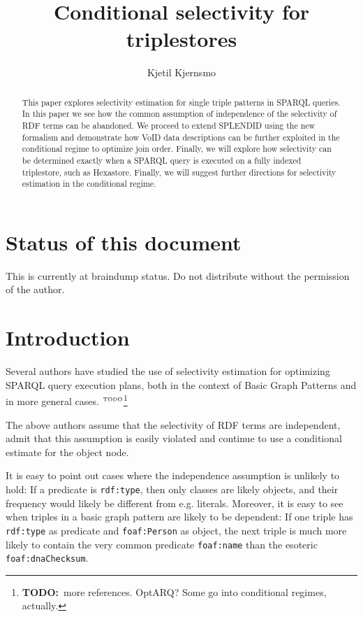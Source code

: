 \documentclass[12pt, draft]{article}
\title{Conditional selectivity for triplestores}
\author{Kjetil Kjernsmo}
\newcommand{\rdfterm}[1]{\texttt{#1}}
\newcommand{\todo}[1]{\ensuremath{^{\textrm{\tiny{TODO}\normalsize}}}\footnote{\textbf{TODO:}~#1}}
\begin{document}
\maketitle

\section*{Status of this document}

This is currently at braindump status. Do not distribute without the
permission of the author.

\begin{abstract}
  This paper explores selectivity estimation for single triple
  patterns in SPARQL queries. In this paper we see how the common
  assumption of independence of the selectivity of RDF terms can be
  abandoned. We proceed to extend SPLENDID\cite{splendid} using the
  new formalism and demonstrate how VoID data descriptions\cite{void}
  can be further exploited in the conditional regime to optimize join
  order. Finally, we will explore how selectivity can be determined
  exactly when a SPARQL query is executed on a fully indexed
  triplestore, such as
  Hexastore\cite{Weiss:2008:HSI:1453856.1453965}. Finally, we will
  suggest further directions for selectivity estimation in the
  conditional regime.

\end{abstract}

\section{Introduction}

Several authors have studied the use of selectivity estimation for
optimizing SPARQL query execution plans, both in the context of Basic
Graph Patterns \cite{Stocker:2008:SBG:1367497.1367578} and in more
general cases. \todo{more references. OptARQ? Some go into conditional
regimes, actually.}

The above authors assume that the selectivity of RDF terms are
independent, admit that this assumption is easily violated and
continue to use a conditional estimate for the object node.

It is easy to point out cases where the independence assumption is
unlikely to hold: If a predicate is \rdfterm{rdf:type}, then only
classes are likely objects, and their frequency would likely be
different from e.g. literals. Moreover, it is easy to see when triples
in a basic graph pattern are likely to be dependent: If one triple has
\rdfterm{rdf:type} as predicate and \rdfterm{foaf:Person} as object,
the next triple is much more likely to contain the very
common predicate \rdfterm{foaf:name} than the esoteric
\rdfterm{foaf:dnaChecksum}.
\end{document}
